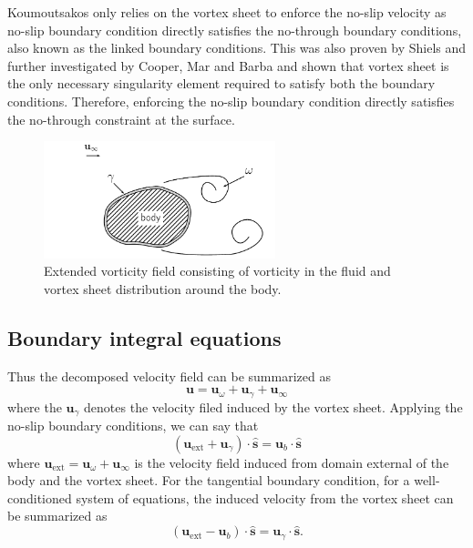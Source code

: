 Koumoutsakos \cite{Koumoutsakos1993b} only relies on the vortex sheet to enforce the no-slip velocity as no-slip boundary condition directly satisfies the no-through boundary conditions, also known as the linked boundary conditions. This was also proven by Shiels \cite{Shiels1998} and further investigated by Cooper, Mar and Barba \cite{Cooper2009b} and shown that vortex sheet is the only necessary singularity element required to satisfy both the boundary conditions. Therefore, enforcing the no-slip boundary condition directly satisfies the no-through constraint at the surface.
	\begin{figure}[t]
	\centering
	\includegraphics[width=0.6\textwidth]{figures/lagrangian/noSlipVorticityField.pdf}
	\caption{Extended vorticity field consisting of vorticity in the fluid and vortex sheet distribution around the body.}
	\label{fig:noSlipVorticityField}
	\end{figure}

\subsection{Boundary integral equations}
Thus the decomposed velocity field can be summarized as
	\begin{equation}
	\mathbf{u} = \mathbf{u}_{\omega} + \mathbf{u}_{\gamma} + \mathbf{u}_{\infty}
	\end{equation}
where the $\mathbf{u}_{\gamma}$ denotes the velocity filed induced by the vortex sheet. Applying the no-slip boundary conditions, we can say that
	\begin{equation}
	\left(\mathbf{u}_{\mathrm{ext}} + \mathbf{u}_{\gamma}\right)\cdot\mathbf{\hat{s}} = \mathbf{u}_b \cdot \mathbf{\hat{s}}
	\label{eq:kinematicBCofVSOutside}
	\end{equation}
where $\mathbf{u}_{\mathrm{ext}} = \mathbf{u}_{\omega} + \mathbf{u}_{\infty}$ is the velocity field induced from domain external of the body and the vortex sheet. For the tangential boundary condition, for a well-conditioned system of equations, the induced velocity from the vortex sheet can be summarized as  
	\begin{equation}
	\left(\mathbf{u}_{\mathrm{ext}} - \mathbf{u}_b\right) \cdot \mathbf{\hat{s}} = \mathbf{u}_{\gamma}\cdot\mathbf{\hat{s}}.
	\label{eq:kinematicBCofVS}
	\end{equation}


